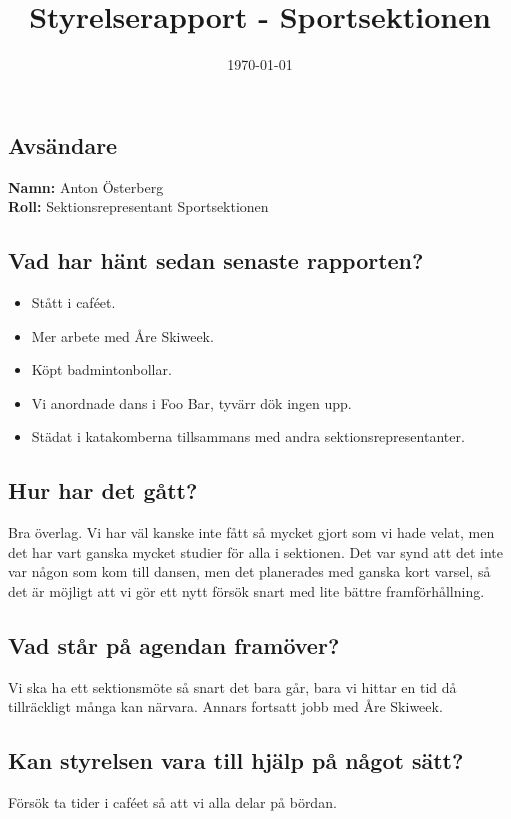 \documentclass[a4paper]{article}
\begin{document}
	\title{Styrelserapport - Sportsektionen}
	\date{\today}
	\maketitle

	\subsection{Avsändare}
		\textbf{Namn:} Anton Österberg\\
		\textbf{Roll:} Sektionsrepresentant Sportsektionen\\
	\subsection{Vad har hänt sedan senaste rapporten?}
	\begin{itemize}
		\item Stått i caféet.
		\item Mer arbete med Åre Skiweek.
		\item Köpt badmintonbollar.
		\item Vi anordnade dans i Foo Bar, tyvärr dök ingen upp.
		\item Städat i katakomberna tillsammans med andra sektionsrepresentanter.
	\end{itemize}
	\subsection{Hur har det gått?}
	Bra överlag. Vi har väl kanske inte fått så mycket gjort som vi hade velat, men det har vart ganska mycket studier för alla i sektionen. Det var synd att det inte var någon som kom
	till dansen, men det planerades med ganska kort varsel, så det är möjligt att vi gör ett nytt försök snart med lite bättre framförhållning.
	\subsection{Vad står på agendan framöver?}
	Vi ska ha ett sektionsmöte så snart det bara går, bara vi hittar en tid då tillräckligt många kan närvara. Annars fortsatt jobb med Åre Skiweek.
	\subsection{Kan styrelsen vara till hjälp på något sätt?}
	Försök ta tider i caféet så att vi alla delar på bördan.
\end{document}
